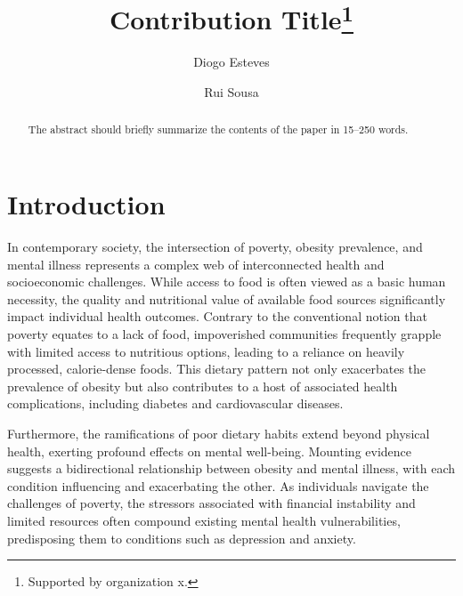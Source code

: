 \documentclass[runningheads]{llncs}
\begin{document}
%
\title{Contribution Title\thanks{Supported by organization x.}}
%
%
\author{Diogo Esteves \and
Rui Sousa}
%
%
%
\maketitle              %
%
\begin{abstract}
The abstract should briefly summarize the contents of the paper in
15--250 words.

\end{abstract}
%
%
%
\section{Introduction}
In contemporary society, the intersection of poverty, obesity prevalence, and mental illness represents a complex web of interconnected health and socioeconomic challenges. While access to food is often viewed as a basic human necessity, the quality and nutritional value of available food sources significantly impact individual health outcomes. Contrary to the conventional notion that poverty equates to a lack of food, impoverished communities frequently grapple with limited access to nutritious options, leading to a reliance on heavily processed, calorie-dense foods. This dietary pattern not only exacerbates the prevalence of obesity but also contributes to a host of associated health complications, including diabetes and cardiovascular diseases.

Furthermore, the ramifications of poor dietary habits extend beyond physical health, exerting profound effects on mental well-being. Mounting evidence suggests a bidirectional relationship between obesity and mental illness, with each condition influencing and exacerbating the other. As individuals navigate the challenges of poverty, the stressors associated with financial instability and limited resources often compound existing mental health vulnerabilities, predisposing them to conditions such as depression and anxiety.
\end{document}
